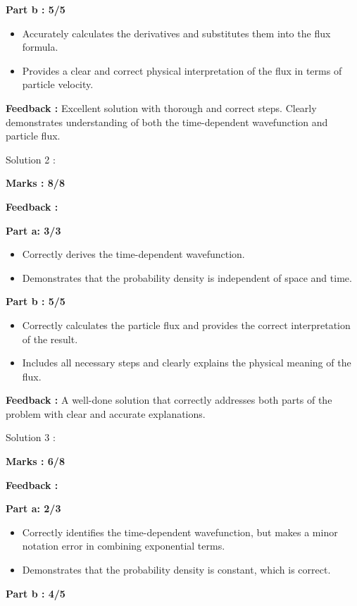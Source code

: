 \documentclass[a4paper,11pt]{article}
\begin{document}
\textbf{Part b : 5/5}

\begin{itemize}
    \item Accurately calculates the derivatives and substitutes them into the flux formula.
    \item Provides a clear and correct physical interpretation of the flux in terms of particle velocity.
\end{itemize}

\textbf{Feedback :}
Excellent solution with thorough and correct steps. Clearly demonstrates understanding of both the time-dependent wavefunction and particle flux.


Solution 2 :

\textbf{Marks : 8/8}

\textbf{Feedback :}

\textbf{Part a: 3/3}
\begin{itemize}
    \item Correctly derives the time-dependent wavefunction.
    \item Demonstrates that the probability density is independent of space and time.
\end{itemize}

\textbf{Part b : 5/5}

\begin{itemize}
    \item Correctly calculates the particle flux and provides the correct interpretation of the result.
    \item Includes all necessary steps and clearly explains the physical meaning of the flux.
\end{itemize}

\textbf{Feedback :}
A well-done solution that correctly addresses both parts of the problem with clear and accurate explanations.


Solution 3 :

\textbf{Marks : 6/8}

\textbf{Feedback :}

\textbf{Part a: 2/3}
\begin{itemize}
    \item Correctly identifies the time-dependent wavefunction, but makes a minor notation error in combining exponential terms.
    \item Demonstrates that the probability density is constant, which is correct.
\end{itemize}

\textbf{Part b : 4/5}
\end{document}
